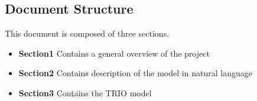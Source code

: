 \subsection{Document Structure}

This document is composed of three sections.
\begin{itemize}
	\item \textbf{Section1} Contains a general overview of the project
	\item \textbf{Section2} Contains description of the model in natural language
	\item \textbf{Section3} Contains the TRIO model
\end{itemize}